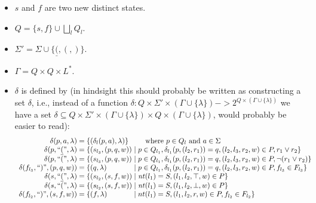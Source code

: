 \documentclass[acmsmall,review,anonymous]{acmart}\settopmatter{printfolios=true,printccs=false,printacmref=false}
\newcommand{\T}{\Sigma} %
\newcommand{\Labels}{L} %
\newcommand{\reqpl}{\underline{(}}
\newcommand{\reqpr}{)}
\newcommand{\pospl}{(}
\newcommand{\pospr}{)}
\newcommand{\nt}{\mathit{nt}} %
\begin{document}
\begin{itemize}
\item $s$ and $f$ are two new distinct states.
\item $Q = \{s, f\} \cup \bigsqcup_l Q_l$.
\item $\T' = \T \cup \{\reqpl, \pospl, \pospr\}$.
\item $\Gamma = Q \times Q \times \Labels^{*}$.
\item $\delta$ is defined by (in hindsight this should probably be written as constructing a set $\delta$, i.e., instead of a function $\delta: Q \times \T' \times (\Gamma \cup \{\lambda\}) -> 2^{Q \times (\Gamma \cup \{\lambda\})}$ we have a set $\delta \subseteq Q \times \T' \times (\Gamma \cup \{\lambda\}) \times Q \times (\Gamma \cup \{\lambda\})$, would probably be easier to read):
  $$
  \begin{array}{r@{\;=\;}l@{\;\mid\;}l}
    \delta(p, a, \lambda)
    & \multicolumn{2}{@{}l@{}}{\{(\delta_l(p, a), \lambda)\} \qquad \text{ where } p \in Q_l \text{ and } a \in \T} \\

    \delta(p, \text{``}\reqpl\text{''}, \lambda)
    & \{ (s_{l_3}, (p, q, w))
    & p \in Q_{l_1}, \delta_{l_1}(p, (l_2, r_1)) = q, (l_2, l_3, r_2, w) \in P, r_1 \lor r_2 \} \\

    \delta(p, \text{``}\pospl\text{''}, \lambda)
    & \{ (s_{l_3}, (p, q, w))
    & p \in Q_{l_1}, \delta_{l_1}(p, (l_2, r_1)) = q, (l_2, l_3, r_2, w) \in P, \neg (r_1 \lor r_2) \} \\

    \delta(f_{l_3}, \text{``}\reqpr\text{''}, (p, q, w))
    & \{ (q, \lambda)
    & p \in Q_{l_1}, \delta_{l_1}(p, (l_2, r_1)) = q, (l_2, l_3, r_2, w) \in P, f_{l_3} \in F_{l_3} \} \\

    \delta(s, \text{``}\reqpl\text{''}, \lambda)
    & \{ (s_{l_2}, (s, f, w))
    & \nt(l_1) = S, (l_1, l_2, \top, w) \in P \} \\

    \delta(s, \text{``}\pospl\text{''}, \lambda)
    & \{ (s_{l_2}, (s, f, w))
    & \nt(l_1) = S, (l_1, l_2, \bot, w) \in P \} \\

    \delta(f_{l_2}, \text{``}\reqpr\text{''}, (s, f, w))
    & \{ (f, \lambda)
    & nt(l_1) = S, (l_1, l_2, r, w) \in P, f_{l_2} \in F_{l_2}\} \\
  \end{array}
  $$
\end{itemize}
\end{document}
